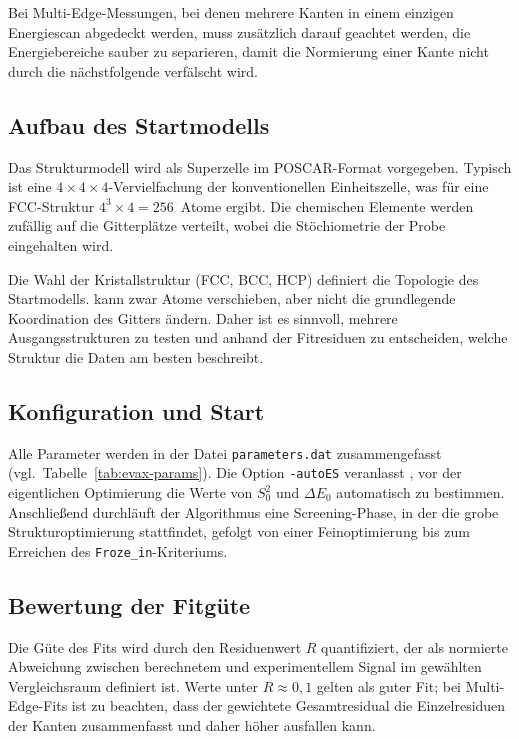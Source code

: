 Bei Multi-Edge-Messungen, bei denen mehrere Kanten in einem einzigen
Energiescan abgedeckt werden, muss zusätzlich darauf geachtet werden,
die Energiebereiche sauber zu separieren, damit die Normierung einer
Kante nicht durch die nächstfolgende verfälscht wird.

\subsection{Aufbau des Startmodells}

Das Strukturmodell wird als Superzelle im POSCAR-Format vorgegeben.
Typisch ist eine $4\times4\times4$-Vervielfachung der konventionellen
Einheitszelle, was für eine FCC-Struktur $4^3 \times 4 = 256$~Atome
ergibt.
Die chemischen Elemente werden zufällig auf die Gitterplätze verteilt,
wobei die Stöchiometrie der Probe eingehalten wird.

Die Wahl der Kristallstruktur (FCC, BCC, HCP) definiert die Topologie
des Startmodells.
\evax{} kann zwar Atome verschieben, aber nicht die grundlegende
Koordination des Gitters ändern.
Daher ist es sinnvoll, mehrere Ausgangsstrukturen zu testen und
anhand der Fitresiduen zu entscheiden, welche Struktur die Daten
am besten beschreibt.

\subsection{Konfiguration und Start}

Alle Parameter werden in der Datei \texttt{parameters.dat}
zusammengefasst (vgl.\ Tabelle~\ref{tab:evax-params}).
Die Option \texttt{-autoES} veranlasst \evax{}, vor der eigentlichen
Optimierung die Werte von $S_0^2$ und $\Delta E_0$ automatisch
zu bestimmen.
Anschließend durchläuft der Algorithmus eine Screening-Phase, in der
die grobe Strukturoptimierung stattfindet, gefolgt von einer
Feinoptimierung bis zum Erreichen des \texttt{Froze\_in}-Kriteriums.

\subsection{Bewertung der Fitgüte}

Die Güte des Fits wird durch den Residuenwert $R$ quantifiziert, der
als normierte Abweichung zwischen berechnetem und experimentellem
Signal im gewählten Vergleichsraum definiert ist.
Werte unter $R \approx 0{,}1$ gelten als guter Fit; bei Multi-Edge-Fits
ist zu beachten, dass der gewichtete Gesamtresidual die
Einzelresiduen der Kanten zusammenfasst und daher höher ausfallen kann.

